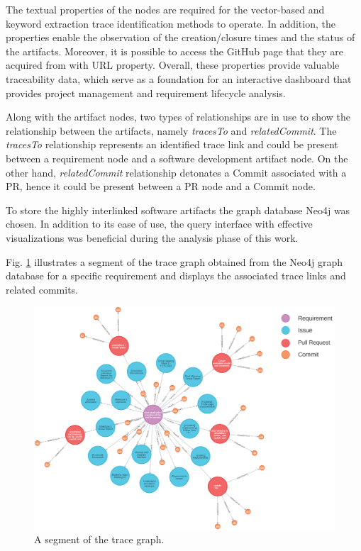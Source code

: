 The textual properties of the nodes are required for the vector-based and keyword extraction trace identification methods to operate. In addition, the properties enable the observation of the creation/closure times and the status of the artifacts. Moreover, it is possible to access  the GitHub page that they are acquired from with URL property. Overall, these properties provide valuable traceability data, which serve as a foundation for an interactive dashboard that provides project management and requirement lifecycle analysis.

 Along with the artifact nodes, two types of relationships are in use to show the relationship between the artifacts, namely \textit{tracesTo} and \textit{relatedCommit}. The \textit{tracesTo} relationship represents an identified trace link and could be present between a requirement node and a software development artifact node. On the other hand, \textit{relatedCommit} relationship detonates a Commit associated with a PR, hence it could be present between a PR node and a Commit node.

To store the highly interlinked software artifacts the graph database Neo4j was chosen.
In addition to its ease of use, the query interface with effective visualizations was beneficial during the analysis phase of this work.

Fig. \ref{fig:rawtracegraph} illustrates a segment of the trace graph obtained from the Neo4j graph database for a specific requirement and displays the associated trace links and related commits.

\begin{figure}[htb]
    \centering
    \includegraphics[width=1\linewidth]{figs/rawTraceGraph.png}
    \caption{A segment of the trace graph.}
    \label{fig:rawtracegraph}
\end{figure}

